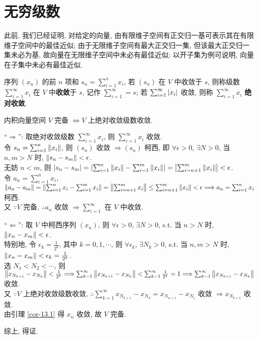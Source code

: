 \documentclass{note}
\begin{document}
\section{无穷级数}
此前, 我们已经证明, 对给定的向量, 由有限维子空间有正交归一基可表示其在有限维子空间中的最佳近似; 由于无限维子空间有最大正交归一集, 但该最大正交归一集未必为基, 故向量在无限维子空间中未必有最佳近似; 以开子集为例可说明, 向量在子集中未必有最佳近似.

\begin{df}[级数收敛和绝对收敛]
    序列 $(x_n)$ 的前 $n$ 项和 $s_n=\sum_{i=1}^nx_i$, 若 $(s_n)$ 在 $V$ 中收敛于 $s$, 则称级数 $\sum_{i=1}^{\infty}x_i$ 在 $V$ 中\textbf{收敛}于 $s$, 记作 $\sum_{i=1}^{\infty}=s$; 若 $\sum_{i=1}^{\infty}\left\lvert x_i\right\rvert$ 收敛, 则称 $\sum_{i=1}^{\infty}x_i$ \textbf{绝对收敛}.
\end{df}

\begin{thm}
    内积向量空间 $V$ 完备 $\Longleftrightarrow V$ 上绝对收敛级数收敛.
\end{thm}
\begin{pf}
    ``$\Longrightarrow$'': 取绝对收敛级数 $\sum_{i=1}^{\infty}x_i$, 则 $\sum_{i=1}^{\infty}x_i$ 收敛.\\
    令 $s_n=\sum_{i=1}^n\left\lVert x_i\right\rVert$, 则 $(s_n)$ 收敛 $\Longrightarrow(s_n)$ 柯西, 即 $\forall\epsilon>0$, $\exists N>0$, 当 $n,m>N$ 时, $\left\lVert s_n-s_m\right\rVert<\epsilon$.\\
    无妨 $n<m$, 则 $\left\lvert s_n-s_m\right\rvert=\left\lvert\sum_{i=1}^n\left\lVert x_i\right\rVert-\sum_{i=1}^m\left\lVert x_i\right\rVert\right\rvert=\left\lvert\sum_{i=n+1}^m\left\lVert x_i\right\rVert\right\rvert<\epsilon$.\\
    令 $a_n=\sum_{i=1}^nx_i$, $\left\lVert a_n-a_m\right\rVert=\left\lVert\sum_{i=1}^nx_i-\sum_{i=1}^mx_i\right\rVert=\left\lVert\sum_{i=n+1}^mx_i\right\rVert\leq\sum_{i=n+1}^m\left\lVert x_i\right\rVert<\epsilon\Longrightarrow a_n=\sum_{i=1}^nx_i$ 柯西.\\
    又 $\because V$ 完备, $\therefore a_n$ 收敛 $\Longrightarrow\sum_{i=1}^{\infty}$ 在 $V$ 中收敛.

    ``$\Longleftarrow$'': 取 $V$ 中柯西序列 $(x_n)$, 则 $\forall\epsilon>0$, $\exists N>0$, s.t. 当 $n>N$ 时, $\left\lVert x_n-x_m\right\rVert<\epsilon$.\\
    特别地, 令 $\epsilon_k=\frac{1}{2^k}$, 其中 $k=0,1,\cdots$, 则 $\forall\epsilon_k$, $\exists N_k>0$, s.t. 当 $n,m>N$ 时, $\left\lVert x_n-x_m\right\rVert<\epsilon_k=\frac{1}{2^k}$.\\
    选 $N_1<N_2<\cdots$, 则 $\left\lVert x_{N_{k+1}}-x_{N_k}\right\rVert<\frac{1}{2^k}\Longrightarrow\sum_{k=1}^{\infty}\left\lVert x_{N_{k+1}}-x_{N_k}\right\rVert<\sum_{k=1}^{\infty}\frac{1}{2^k}=1\Longrightarrow\sum_{k=1}^{\infty}\left\lVert x_{N_{k+1}}-x_{N_k}\right\rVert$ 收敛.\\
    又 $\because V$ 上绝对收敛级数收敛, $\therefore\sum_{k=1}^{\infty}x_{N_{k+1}}-x_{N_k}=x_{N_{n+1}}-x_{N_1}$ 收敛 $\Longrightarrow x_{N_{k+1}}$ 收敛.\\
    由引理 \ref{cor-13.1} 得 $x_n$ 收敛, 故 $V$ 完备.

    综上, 得证.
\end{pf}
\end{document}
